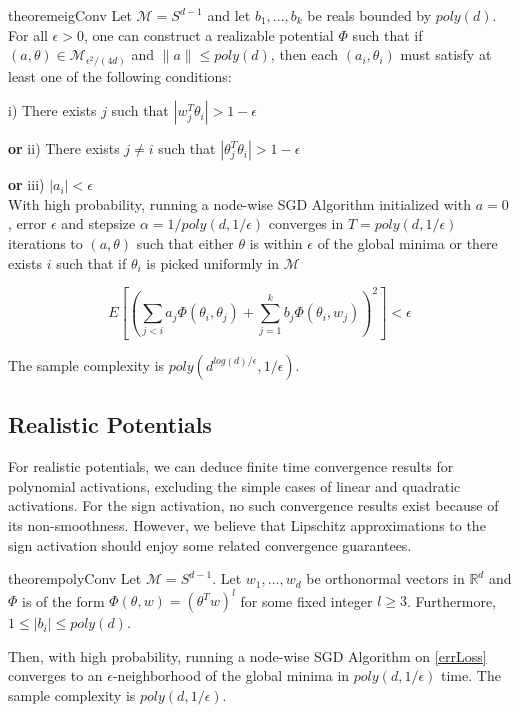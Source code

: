 \documentclass{article}
\newcommand{\R}{{\mathbb{R}}}
\begin{document}
\begin{restatable}{theorem}{eigConv}
\label{eigConv}
Let $\mathcal{M} = S^{d-1}$ and let $b_1,...,b_k$ be reals bounded by $poly(d)$. For all $ \epsilon > 0$, one can construct a realizable potential $\Phi$ such that if $(a,\theta) \in \mathcal{M}_{\epsilon^2/(4d)}$ and $\|a\| \leq poly(d)$, then each $(a_i, \theta_i)$ must satisfy at least one of the following conditions:


i) There exists $j$ such that $|w_j^T\theta_i| > 1- \epsilon$ 

{\bf or} ii) There exists $j\neq i$ such that $|\theta_j^T\theta_i| > 1- \epsilon$ 

{\bf or} iii) $|a_i| < \epsilon$\\


With high probability, running a node-wise SGD Algorithm initialized with $a = 0$, error $\epsilon$ and stepsize $\alpha = 1/poly(d,1/\epsilon)$ converges in $T = poly(d, 1/\epsilon)$ iterations to $(a,\theta)$ such that either  $\theta$ is within $\epsilon$ of the global minima or there exists $i$ such that if $\theta_i$ is picked uniformly in $\mathcal{M}$


\[ E\left[\left( \sum_{j < i} a_j \Phi(\theta_i,\theta_j) + \sum_{j=1}^k b_j \Phi(\theta_i,w_j)\right)^2\right] < \epsilon\]

The sample complexity is $poly(d^{log(d)/\epsilon},1/\epsilon)$.

\end{restatable}






\subsection{Realistic Potentials}

For realistic potentials, we can deduce finite time convergence results for polynomial activations, excluding the simple cases of linear and quadratic activations. For the sign activation, no such convergence results exist because of its non-smoothness. However, we believe that Lipschitz approximations to the sign activation should enjoy some related convergence guarantees.


\begin{restatable}{theorem}{polyConv}
\label{PolyConv}
Let $\mathcal{M} = S^{d-1}$. Let $w_1,...,w_d$ be orthonormal vectors in $\R^d$ and $\Phi$ is of the form $\Phi(\theta,w) = (\theta^Tw)^l$ for some fixed integer $l \geq 3$. Furthermore, $1 \leq |b_i|\leq poly(d)$. 

Then, with high probability, running a node-wise SGD Algorithm on \eqref{errLoss} converges to an $\epsilon$-neighborhood of the global minima in $poly(d,1/\epsilon)$ time. The sample complexity is $poly(d,1/\epsilon)$.
\end{restatable}
\end{document}
